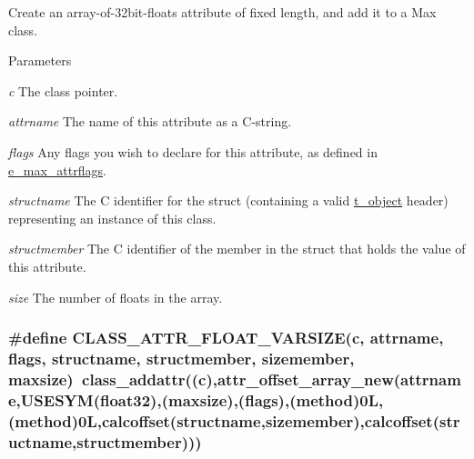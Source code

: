 Create an array-\/of-\/32bit-\/floats attribute of fixed length, and add it to a Max class. 
\begin{DoxyParams}{Parameters}
\item[{\em c}]The class pointer. \item[{\em attrname}]The name of this attribute as a C-\/string. \item[{\em flags}]Any flags you wish to declare for this attribute, as defined in \hyperlink{group__attr_gaf296cfc6741bb19207f6ed8062809115}{e\_\-max\_\-attrflags}. \item[{\em structname}]The C identifier for the struct (containing a valid \hyperlink{structt__object}{t\_\-object} header) representing an instance of this class. \item[{\em structmember}]The C identifier of the member in the struct that holds the value of this attribute. \item[{\em size}]The number of floats in the array. \end{DoxyParams}
\hypertarget{group__attr_ga42728b2c87e32f9efe5dadb9c72ce434}{
\subsubsection[{CLASS\_\-ATTR\_\-FLOAT\_\-VARSIZE}]{\setlength{\rightskip}{0pt plus 5cm}\#define CLASS\_\-ATTR\_\-FLOAT\_\-VARSIZE(c, \/  attrname, \/  flags, \/  structname, \/  structmember, \/  sizemember, \/  maxsize)~class\_\-addattr((c),attr\_\-offset\_\-array\_\-new(attrname,USESYM(float32),(maxsize),(flags),({\bf method})0L,(method)0L,calcoffset(structname,sizemember),calcoffset(structname,structmember)))}}
\label{group__attr_ga42728b2c87e32f9efe5dadb9c72ce434}


